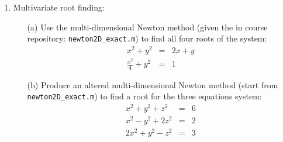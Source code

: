 \documentclass{article}
\begin{document}
\begin{enumerate}
\begin{itemize}
  \end{itemize}
  \item Multivariate root finding:
  \begin{itemize}
    \item[(a)]  Use the multi-dimensional Newton method (given the in course repository:  \texttt{newton2D\_exact.m}) to find all four roots of the system:
    \begin{eqnarray}
      x^2+y^2&=&2x+y \\
      \frac{x^2}{4}+y^2&=&1      
    \end{eqnarray}
    \item[(b)]  Produce an altered multi-dimensional Newton method (start from \texttt{newton2D\_exact.m}) to find a root for the three equations system:
    \begin{eqnarray}
      x^2+y^2+z^2&=&6\\
      x^2-y^2+2z^2&=&2\\
      2x^2+y^2-z^2&=&3   
    \end{eqnarray}    
  \end{itemize}
\end{enumerate}
\end{document}
